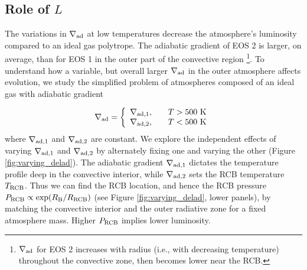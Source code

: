 \documentclass[apj]{emulateapj}
\newcommand{\delad}{\nabla_{\rm ad}}
\newcommand{\RB}{R_{\rm B}}
\newcommand{\cb}{_{\rm RCB}}
\begin{document}
\subsection{Role of $L$}



The variations in $\delad$ at low temperatures decrease the atmosphere's luminosity compared to an ideal gas polytrope. The adiabatic gradient of EOS 2 is larger, on average, than for EOS 1 in the outer part of the convective region \footnote {$\delad$ for EOS 2 increases with radius (i.e., with decreasing temperature) throughout the convective zone, then becomes lower near the RCB.}. To understand how a variable, but overall larger $\delad$ in the outer atmosphere affects evolution, we study the simplified problem of atmospheres composed of an ideal gas with adiabatic gradient 

\begin{equation}
\label{eq:deladvar}
\delad = \left\{
\begin{array}{l l}
\nabla_{\rm ad, 1}, & \quad T > 500 \text{ K} \\
\nabla_{\rm ad, 2}, & \quad T < 500 \text{ K}
\end{array} 
\right.
\end{equation}   
where $\nabla_{\rm ad, 1}$ and $\nabla_{\rm ad,2}$ are constant. We explore the independent effects of varying $\nabla_{\rm ad,1}$ and $\nabla_{\rm ad,2}$ by alternately fixing one and varying the other   (Figure \ref{fig:varying_delad}). The adiabatic gradient $\nabla_{\rm ad,1}$ dictates the temperature profile deep in the convective interior, while $\nabla_{\rm ad,2}$ sets the RCB temperature $T\cb$. Thus we can find the RCB location, and hence the RCB pressure $P\cb \propto \exp(\RB/R\cb)$ (see Figure \ref{fig:varying_delad}, lower panels), by matching the convective interior and the outer radiative zone for a fixed atmosphere mass. Higher $P\cb$ implies lower luminosity.
\end{document}

